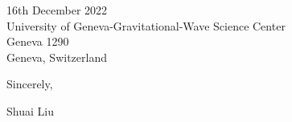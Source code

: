 \documentclass[11pt,a4paper,sans]{letter} %
\begin{document}
\begin{letter}{16th December 2022 \\
University of Geneva-Gravitational-Wave Science Center\\
Geneva 1290\\ 
Geneva, Switzerland}
         
Sincerely,

Shuai Liu




\end{letter}
\end{document}

